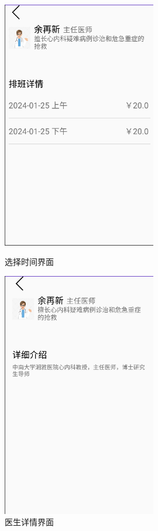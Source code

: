 \documentclass[UTF8,12pt]{article}
\begin{document}
\begin{figure}[htbp]
    \begin{minipage}[t]{0.45\textwidth}
        \centering
        \includegraphics[width=0.6\textwidth]{imgs/24.png}
        \caption{选择时间界面}
    \end{minipage}%
    \begin{minipage}[t]{0.45\textwidth}
        \centering
        \includegraphics[width=0.6\textwidth]{imgs/23.png}
        \caption{医生详情界面}
    \end{minipage}
\end{figure}
\end{document}
